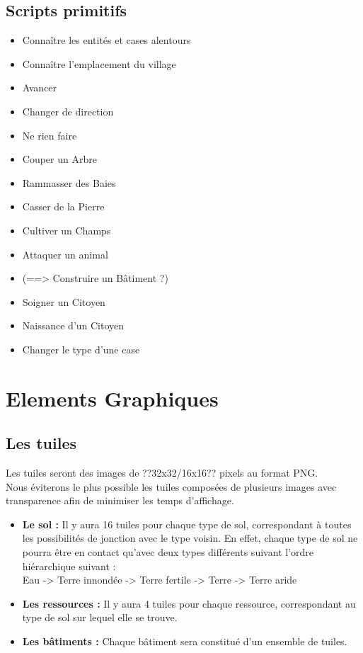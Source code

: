 \documentclass[a4paper]{article}
\begin{document}
\subsection*{Scripts primitifs}
\begin{itemize} \small
  \item Connaître les entités et cases alentours
  \item Connaître l'emplacement du village
  \item Avancer
  \item Changer de direction
  \item Ne rien faire
  \item Couper un Arbre
  \item Rammasser des Baies
  \item Casser de la Pierre
  \item Cultiver un Champs
  \item Attaquer un animal
  \item (==> Construire un Bâtiment ?)
  \item Soigner un Citoyen
  \item Naissance d'un Citoyen
  \item Changer le type d'une case
\end{itemize} \normalsize


\section*{Elements Graphiques}

\subsection*{Les tuiles}
Les tuiles seront des images de ??32x32/16x16?? pixels au format PNG.\\
Nous éviterons le plus possible les tuiles composées de plusieurs images avec transparence afin de minimiser les temps d'affichage.
\begin{itemize}
  \item \textbf{Le sol :}\small{ Il y aura 16 tuiles pour chaque type de sol, correspondant à toutes les possibilités de jonction avec le type voisin. En effet, chaque type de sol ne pourra être en contact qu'avec deux types différents suivant l'ordre hiérarchique suivant :\\
Eau -> Terre innondée -> Terre fertile -> Terre -> Terre aride}
  \item \textbf{Les ressources :}\small{ Il y aura 4 tuiles pour chaque ressource, correspondant au type de sol sur lequel elle se trouve.}
  \item \textbf{Les bâtiments :}\small{ Chaque bâtiment sera constitué d'un ensemble de tuiles.}
\end{itemize}
\end{document}
